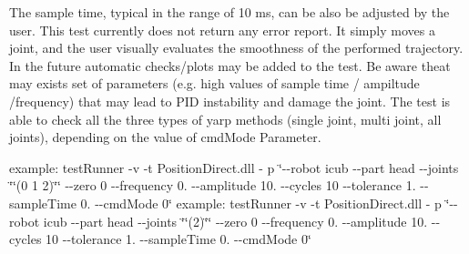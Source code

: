 The sample time, typical in the range of 10 ms, can be also be adjusted by the user. This test currently does not return any error report. It simply moves a joint, and the user visually evaluates the smoothness of the performed trajectory. In the future automatic checks/plots may be added to the test. Be aware theat may exists set of parameters (e.\-g. high values of sample time / ampiltude /frequency) that may lead to P\-I\-D instability and damage the joint. The test is able to check all the three types of yarp methods (single joint, multi joint, all joints), depending on the value of cmd\-Mode Parameter.

example\-: test\-Runner -\/v -\/t Position\-Direct.\-dll -\/ p \char`\"{}-\/-\/robot icub -\/-\/part head -\/-\/joints \char`\"{}\char`\"{}(0 1 2)\char`\"{}\char`\"{} -\/-\/zero 0 -\/-\/frequency 0. -\/-\/amplitude 10. -\/-\/cycles 10 -\/-\/tolerance 1. -\/-\/sample\-Time 0. -\/-\/cmd\-Mode 0\char`\"{} example\-: test\-Runner -\/v -\/t Position\-Direct.\-dll -\/ p \char`\"{}-\/-\/robot icub -\/-\/part head -\/-\/joints \char`\"{}\char`\"{}(2)\char`\"{}\char`\"{} -\/-\/zero 0 -\/-\/frequency 0. -\/-\/amplitude 10. -\/-\/cycles 10 -\/-\/tolerance 1. -\/-\/sample\-Time 0. -\/-\/cmd\-Mode 0\char`\"{}

